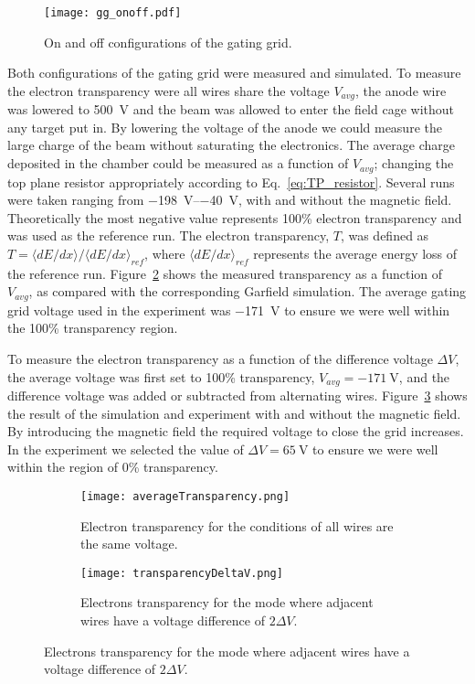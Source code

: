 \begin{figure}[!htb]
\centering
\texttt{[image: gg\_onoff.pdf]}
\caption{On and off configurations of the gating grid.}
\label{fig:gg_onoff}
\end{figure}


Both configurations of the gating grid were measured and simulated. To measure the electron transparency were all wires share the voltage $V_{avg}$, the anode wire was lowered to \SI{500}{\volt} and the beam was allowed to enter the field cage without any target put in. By lowering the voltage of the anode we could measure the large charge of the beam without saturating the electronics. The average charge deposited in the chamber could be measured as a function of $V_{avg}$; changing the top plane resistor appropriately according to Eq.~\ref{eq:TP_resistor}. Several runs were taken ranging from \SIrange{-198}{-40}{\volt}, with and without the magnetic field. Theoretically the most negative value represents 100\% electron transparency and was used as the reference run. The electron transparency, $T$, was defined as $T = \langle dE/dx\rangle/{\langle dE/dx\rangle}_{ref}$, where $\langle dE/dx\rangle_{ref}$ represents the average energy loss of the reference run. Figure~\ref{fig:ggAvgTrans} shows the measured transparency as a function of $V_{avg}$, as compared with the corresponding Garfield simulation. The average gating grid voltage used in the experiment was \SI{-171}{\volt} to ensure we were well within the 100\% transparency region. 

To measure the electron transparency as a function of the difference voltage $\Delta V$, the average voltage was first set to 100\% transparency, $V_{avg}=\SI{-171}{\volt}$, and the difference voltage was added or subtracted from alternating wires. Figure~\ref{fig:ggDeltaVTrans} shows the result of the simulation and experiment with and without the magnetic field. By introducing the magnetic field the required voltage to close the grid increases. In the experiment we selected the value of $\Delta V = \SI{65}{\volt}$ to ensure we were well within the region of 0\% transparency.  

\begin{figure}[!htb]
    \centering
    \begin{subfigure}[t]{0.49\textwidth}
        \centering
        \texttt{[image: averageTransparency.png]} 
        \caption{Electron transparency for the conditions of all wires are the same voltage.} \label{fig:ggAvgTrans}
    \end{subfigure}
    \hfill
    \begin{subfigure}[t]{0.49\textwidth}
        \centering
        \texttt{[image: transparencyDeltaV.png]} 
        \caption{Electrons transparency for the mode where adjacent wires have a voltage difference of $2 \Delta V$.} \label{fig:ggDeltaVTrans}
    \end{subfigure}
\label{fig:ggTrans}
\end{figure}



